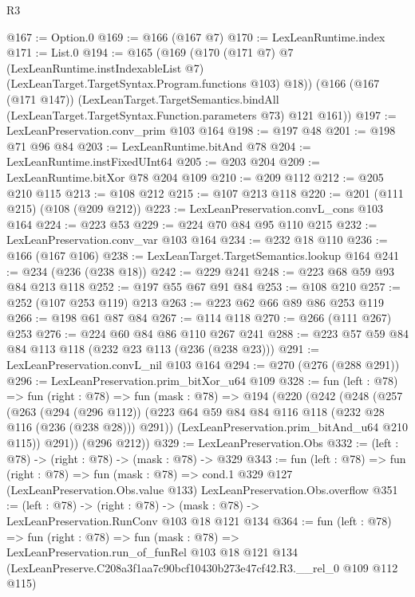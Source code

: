 \begin{lexlean}{R3}
\begin{coremodule}
@167 := Option.{0}
@169 := @166 (@167 @7)
@170 := LexLeanRuntime.index
@171 := List.{0}
@194 := @165
    (@169
      (@170
        (@171 @7)
        @7
        (LexLeanRuntime.instIndexableList @7)
        (LexLeanTarget.TargetSyntax.Program.functions @103)
        @18))
    (@166
      (@167 (@171 @147))
      (LexLeanTarget.TargetSemantics.bindAll
        (LexLeanTarget.TargetSyntax.Function.parameters @73)
        @121
        @161))
@197 := LexLeanPreservation.conv_prim @103 @164
@198 := @197 @48
@201 := @198 @71 @96 @84
@203 := LexLeanRuntime.bitAnd @78
@204 := LexLeanRuntime.instFixedUInt64
@205 := @203 @204
@209 := LexLeanRuntime.bitXor @78 @204 @109
@210 := @209 @112
@212 := @205 @210 @115
@213 := @108 @212
@215 := @107 @213 @118
@220 := @201 (@111 @215) (@108 (@209 @212))
@223 := LexLeanPreservation.convL_cons @103 @164
@224 := @223 @53
@229 := @224 @70 @84 @95 @110 @215
@232 := LexLeanPreservation.conv_var @103 @164
@234 := @232 @18 @110
@236 := @166 (@167 @106)
@238 := LexLeanTarget.TargetSemantics.lookup @164
@241 := @234 (@236 (@238 @18))
@242 := @229 @241
@248 := @223 @68 @59 @93 @84 @213 @118
@252 := @197 @55 @67 @91 @84
@253 := @108 @210
@257 := @252 (@107 @253 @119) @213
@263 := @223 @62 @66 @89 @86 @253 @119
@266 := @198 @61 @87 @84
@267 := @114 @118
@270 := @266 (@111 @267) @253
@276 := @224 @60 @84 @86 @110 @267 @241
@288 := @223 @57 @59 @84 @84 @113 @118 (@232 @23 @113 (@236 (@238 @23)))
@291 := LexLeanPreservation.convL_nil @103 @164
@294 := @270 (@276 (@288 @291))
@296 := LexLeanPreservation.prim_bitXor_u64 @109
@328 := fun (left : @78) =>
  fun (right : @78) =>
  fun (mask : @78) =>
  @194
    (@220
      (@242
        (@248
          (@257
            (@263
              (@294 (@296 @112))
              (@223 @64 @59 @84 @84 @116 @118 (@232 @28 @116 (@236 (@238 @28))) @291))
            (LexLeanPreservation.prim_bitAnd_u64 @210 @115))
          @291))
      (@296 @212))
@329 := LexLeanPreservation.Obs
@332 := (left : @78) -> (right : @78) -> (mask : @78) -> @329
@343 := fun (left : @78) =>
  fun (right : @78) =>
  fun (mask : @78) =>
  cond.{1} @329 @127 (LexLeanPreservation.Obs.value @133) LexLeanPreservation.Obs.overflow
@351 := (left : @78) ->
  (right : @78) -> (mask : @78) -> LexLeanPreservation.RunConv @103 @18 @121 @134
@364 := fun (left : @78) =>
  fun (right : @78) =>
  fun (mask : @78) =>
  LexLeanPreservation.run_of_funRel
    @103
    @18
    @121
    @134
    (LexLeanPreserve.C208a3f1aa7c90bcf10430b273e47cf42.R3.__rel_0 @109 @112 @115)
\end{coremodule}
\end{lexlean}
